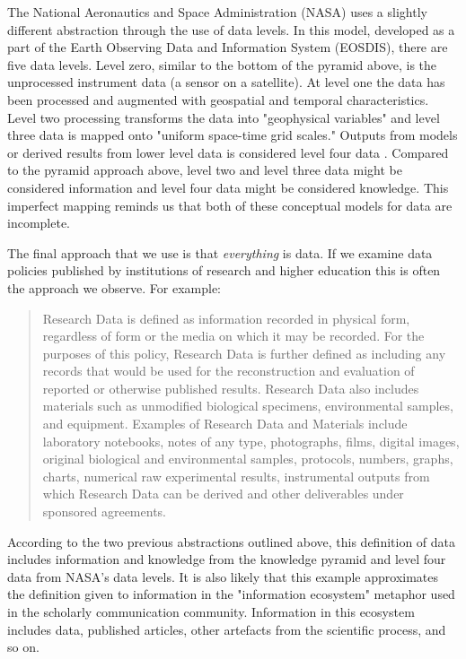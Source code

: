 The National Aeronautics and Space Administration (NASA) uses a slightly different abstraction through the use of data levels. In this model, developed as a part of the Earth Observing Data and Information System (EOSDIS), there are five data levels. Level zero, similar to the bottom of the pyramid above, is the unprocessed instrument data (a sensor on a satellite). At level one the data has been processed and augmented with geospatial and temporal characteristics. Level two processing transforms the data into "geophysical variables" and level three data is mapped onto "uniform space-time grid scales." Outputs from models or derived results from lower level data is considered level four data \cite{nasa_2010}. Compared to the pyramid approach above, level two and level three data might be considered information and level four data might be considered knowledge. This imperfect mapping reminds us that both of these conceptual models for data are incomplete.

The final approach that we use is that \textit{everything} is data. If we examine data policies published by institutions of research and higher education this is often the approach we observe. For example: 

\begin{quote}
Research Data is defined as information recorded in physical form, regardless of form or the media on which it may be recorded. For the purposes of this policy, Research Data is further defined as including any records that would be used for the reconstruction and evaluation of reported or otherwise published results. Research Data also includes materials such as unmodified biological specimens, environmental samples, and equipment. Examples of Research Data and Materials include laboratory notebooks, notes of any type, photographs, films, digital images, original biological and environmental samples, protocols, numbers, graphs, charts, numerical raw experimental results, instrumental outputs from which Research Data can be derived and other deliverables under sponsored agreements. \cite{jhu_2008}
\end{quote}

According to the two previous abstractions outlined above, this definition of data includes information and knowledge from the knowledge pyramid and level four data from NASA's data levels. It is also likely that this example approximates the definition given to information in the "information ecosystem" metaphor used in the scholarly communication community. Information in this ecosystem includes data, published articles, other artefacts from the scientific process, and so on.
